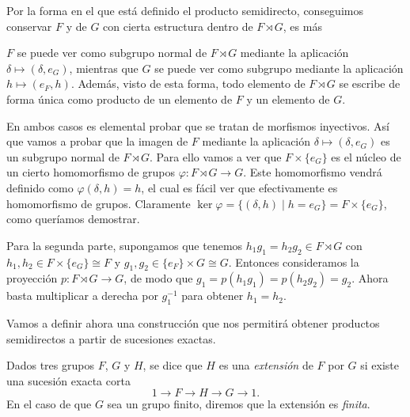 \documentclass[TFG.tex]{subfiles}
\begin{document}
Por la forma en el que está definido el producto semidirecto, conseguimos conservar $F$ y de $G$ con cierta estructura dentro de $F\rtimes G$, es más 
\begin{prop}\label{reciproco}
 $F$ se puede ver como subgrupo normal de $F\rtimes G$ mediante la aplicación $\delta\mapsto (\delta,e_G)$, mientras que $G$ se puede ver como subgrupo mediante la aplicación $h\mapsto (e_F,h)$. Además, visto de esta forma, todo elemento de $F\rtimes G$ se escribe de forma única como producto de un elemento de $F$ y un elemento de $G$.
\end{prop}
\begin{dem}
En ambos casos es elemental probar que se tratan de morfismos inyectivos. Así que vamos a probar que la imagen de $F$ mediante la aplicación $\delta\mapsto (\delta,e_G)$ es un subgrupo normal de $F\rtimes G$. Para ello vamos a ver que $F\times\{e_G\}$ es el núcleo de un cierto homomorfismo de grupos $\varphi:F\rtimes G\to G$. Este homomorfismo vendrá definido como $\varphi(\delta,h)=h$, el cual es fácil ver que efectivamente es homomorfismo de grupos. Claramente $\ker\varphi=\{(\delta,h)\mid h=e_G\}=F\times\{e_G\}$, como queríamos demostrar. 

Para la segunda parte, supongamos que tenemos $h_1g_1=h_2g_2\in F\rtimes G$ con $h_1,h_2\in F\times\{e_G\}\cong F$ y $g_1,g_2\in \{e_F\}\times G\cong G$. Entonces consideramos la proyección $p:F\rtimes G\to G$, de modo que $g_1=p(h_1g_1)=p(h_2g_2)=g_2$. Ahora basta multiplicar a derecha por $g_1^{-1}$ para obtener $h_1=h_2$.
\QED
\end{dem}



Vamos a definir ahora una construcción que nos permitirá obtener productos semidirectos a partir de sucesiones exactas.

\begin{defi}
Dados tres grupos $F$, $G$ y $H$, se dice que $H$ es una \emph{extensión} de $F$ por $G$ si existe una sucesión exacta corta
\[
1\to F\to H\to G\to 1.
\]
En el caso de que $G$ sea un grupo finito, diremos que la extensión es \emph{finita}.
\end{defi} 
\end{document}
